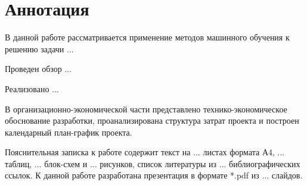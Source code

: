 \section*{Аннотация}

В данной работе рассматривается применение методов машинного обучения к решению задачи ...

Проведен обзор ...

Реализовано ...

В организационно-экономической части представлено технико-экономическое обоснование разработки, проанализирована структура затрат проекта и построен календарный план-график проекта.

Пояснительная записка к работе содержит текст на ... листах формата А4, ... таблиц, ... блок-схем и ... рисунков, список литературы из ... библиографических ссылок. К данной работе разработана презентация в формате *.pdf из ... слайдов.
